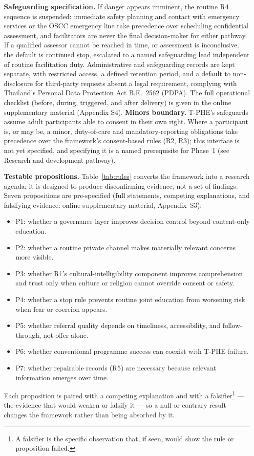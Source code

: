 \documentclass[11pt]{article}
\newcommand{\tphe}{T\mbox{-}PHE}
\begin{document}
\textbf{Safeguarding specification.} If danger appears imminent, the routine R4 sequence is suspended: immediate safety planning and contact with emergency services or the OSCC emergency line take precedence over scheduling confidential assessment, and facilitators are never the final decision-maker for either pathway. If a qualified assessor cannot be reached in time, or assessment is inconclusive, the default is continued stop, escalated to a named safeguarding lead independent of routine facilitation duty. Administrative and safeguarding records are kept separate, with restricted access, a defined retention period, and a default to non-disclosure for third-party requests absent a legal requirement, complying with Thailand's Personal Data Protection Act B.E.~2562 (PDPA). The full operational checklist (before, during, triggered, and after delivery) is given in the online supplementary material (Appendix S4). \textbf{Minors boundary.} \tphe{}'s safeguards assume adult participants able to consent in their own right. Where a participant is, or may be, a minor, duty-of-care and mandatory-reporting obligations take precedence over the framework's consent-based rules (R2, R3); this interface is not yet specified, and specifying it is a named prerequisite for Phase~1 (see Research and development pathway).

\textbf{Testable propositions.} Table~\ref{tab:rules} converts the framework into a research agenda; it is designed to produce disconfirming evidence, not a set of findings. Seven propositions are pre-specified (full statements, competing explanations, and falsifying evidence: online supplementary material, Appendix~S3):
\begin{itemize}
\item P1: whether a governance layer improves decision control beyond content-only education.
\item P2: whether a routine private channel makes materially relevant concerns more visible.
\item P3: whether R1's cultural-intelligibility component improves comprehension and trust only when culture or religion cannot override consent or safety.
\item P4: whether a stop rule prevents routine joint education from worsening risk when fear or coercion appears.
\item P5: whether referral quality depends on timeliness, accessibility, and follow-through, not offer alone.
\item P6: whether conventional programme success can coexist with \tphe{} failure.
\item P7: whether repairable records (R5) are necessary because relevant information emerges over time.
\end{itemize}
Each proposition is paired with a competing explanation and with a falsifier\footnote{A falsifier is the specific observation that, if seen, would show the rule or proposition failed.} --- the evidence that would weaken or falsify it --- so a null or contrary result changes the framework rather than being absorbed by it.
\end{document}
